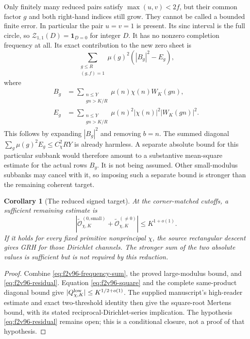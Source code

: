 \documentclass[11pt]{article}
\newtheorem{corollary}[theorem]{Corollary}
\theoremstyle{definition}
\theoremstyle{remark}
\begin{document}
Only finitely many reduced pairs satisfy \(\max(u,v)<2f\), but
their common factor \(g\) and both right-hand indices still grow.
They cannot be called a bounded finite error.  In particular the pair
\(u=v=1\) is present.  Its sinc interval is the full circle, so
\(\mathscr Z_{1,1}(D)=\mathbf1_{D=0}\) for integer \(D\).
It has no nonzero completion frequency at all.  Its exact contribution
to the new zero sheet is
\begin{equation}
 \sum_{\substack{g\le R\\(g,f)=1}}\mu(g)^2
       \left(|B_g|^2-E_g\right),
 \label{eq:f2v96-unit-pair}
\end{equation}
where
\begin{align}
 B_g&=\sum_{\substack{n\le Y\\gn>K/R}}
                 \mu(n)\chi(n)W_K(gn),
 \label{eq:f2v96-Bg}\\
 E_g&=\sum_{\substack{n\le Y\\gn>K/R}}
                 \mu(n)^2|\chi(n)|^2|W_K(gn)|^2.
 \label{eq:f2v96-Eg}
\end{align}
This follows by expanding \(|B_g|^2\) and removing \(b=n\).
The summed diagonal \(\sum_g\mu(g)^2E_g\le C_\chi^2RY\) is
already harmless.  A separate absolute bound for this particular
subbank would therefore amount to a substantive mean-square estimate
for the actual rows \(B_g\).  It is not being assumed.  Other
small-modulus subbanks may cancel with it, so imposing such a separate
bound is stronger than the remaining coherent target.

\begin{corollary}[The reduced signed target]
\label{cor:f2v96-reduced-target}
At the corner-matched cutoffs, a sufficient remaining estimate is
\begin{equation}
 \left|
 \widetilde{\mathcal O}_{\chi,K}^{(0,\mathrm{small})}
 +\widetilde{\mathcal O}_{\chi,K}^{(\ne0)}
 \right|\le K^{1+o(1)}.
 \label{eq:f2v96-residual}
\end{equation}
If it holds for every fixed primitive nonprincipal \(\chi\), the
source rectangular descent gives GRH for those Dirichlet channels.
The stronger sum of the two absolute values is sufficient but is not
required by this reduction.
\end{corollary}

\begin{proof}
Combine \eqref{eq:f2v96-frequency-sum}, the proved large-modulus
bound, and \eqref{eq:f2v96-residual}.  Equation
\eqref{eq:f2v96-square} and the complete same-product diagonal bound
give \(|Q_{\chi,K}^{\rm low}|\le K^{1/2+o(1)}\).
The supplied manuscript's high-reader estimate and exact two-threshold
identity then give the square-root Mertens bound, with its stated
reciprocal-Dirichlet-series implication.  The hypothesis
\eqref{eq:f2v96-residual} remains open; this is a conditional closure,
not a proof of that hypothesis.
\end{proof}
\end{document}

